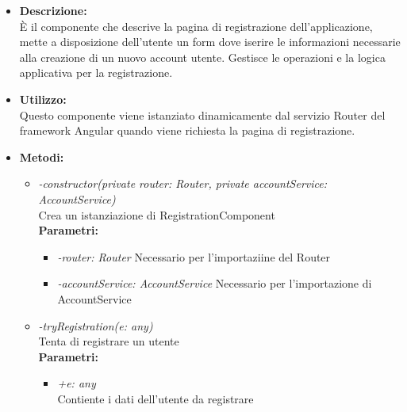 \begin{itemize}
    \item \textbf{Descrizione:}\\
    È il componente che descrive la pagina di registrazione dell’applicazione, mette a disposizione dell’utente un form dove iserire le informazioni necessarie alla creazione di un nuovo account utente. Gestisce le operazioni e la logica applicativa per la registrazione.
    \item \textbf{Utilizzo:}\\
    Questo componente viene istanziato dinamicamente dal servizio Router del framework Angular quando viene richiesta la pagina di registrazione.
	\item \textbf{Metodi:}
    \begin{itemize}
    	\item \emph{-constructor(private router: Router, private accountService: AccountService)}\\
    	Crea un istanziazione di RegistrationComponent\\
    	\textbf{Parametri:}
    		\begin{itemize}
    			\item \emph{-router: Router}
    			Necessario per l'importaziine del Router
    			\item \emph{-accountService: AccountService}
    			Necessario per l'importazione di AccountService
    		\end{itemize}
    	\item \emph{-tryRegistration(e: any)}\\
    	Tenta di registrare un utente\\
    	\textbf{Parametri:}
    		\begin{itemize}
    			\item \emph{+e: any}\\
    			Contiente i dati dell'utente da registrare
    		\end{itemize}
    \end{itemize}
\end{itemize}